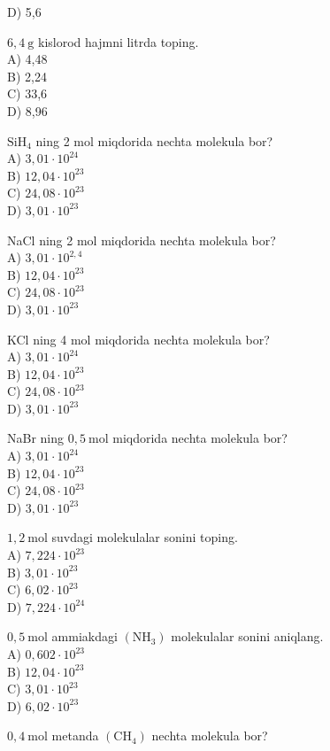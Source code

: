 D) 5,6
  \item $6,4 \mathrm{~g}$ kislorod hajmni litrda toping.\\
A) 4,48\\
B) 2,24\\
C) 33,6\\
D) 8,96
  \item $\mathrm{SiH}_{4}$ ning 2 mol miqdorida nechta molekula bor?\\
A) $3,01 \cdot 10^{24}$\\
B) $12,04 \cdot 10^{23}$\\
C) $24,08 \cdot 10^{23}$\\
D) $3,01 \cdot 10^{23}$\\
  \item NaCl ning 2 mol miqdorida nechta molekula bor?\\
A) $3,01 \cdot 10^{2,4}$\\
B) $12,04 \cdot 10^{23}$\\
C) $24,08 \cdot 10^{23}$\\
D) $3,01 \cdot 10^{23}$
  \item KCl ning 4 mol miqdorida nechta molekula bor?\\
A) $3,01 \cdot 10^{24}$\\
B) $12,04 \cdot 10^{23}$\\
C) $24,08 \cdot 10^{23}$\\
D) $3,01 \cdot 10^{23}$
  \item NaBr ning $0,5 \mathrm{~mol}$ miqdorida nechta molekula bor?\\
A) $3,01 \cdot 10^{24}$\\
B) $12,04 \cdot 10^{23}$\\
C) $24,08 \cdot 10^{23}$\\
D) $3,01 \cdot 10^{23}$
  \item $1,2 \mathrm{~mol}$ suvdagi molekulalar sonini toping.\\
A) $7,224 \cdot 10^{23}$\\
B) $3,01 \cdot 10^{23}$\\
C) $6,02 \cdot 10^{23}$\\
D) $7,224 \cdot 10^{24}$
  \item $0,5 \mathrm{~mol}$ ammiakdagi $\left(\mathrm{NH}_{3}\right)$ molekulalar sonini aniqlang.\\
A) $0,602 \cdot 10^{23}$\\
B) $12,04 \cdot 10^{23}$\\
C) $3,01 \cdot 10^{23}$\\
D) $6,02 \cdot 10^{23}$
  \item $0,4 \mathrm{~mol}$ metanda $\left(\mathrm{CH}_{4}\right)$ nechta molekula bor?\\
